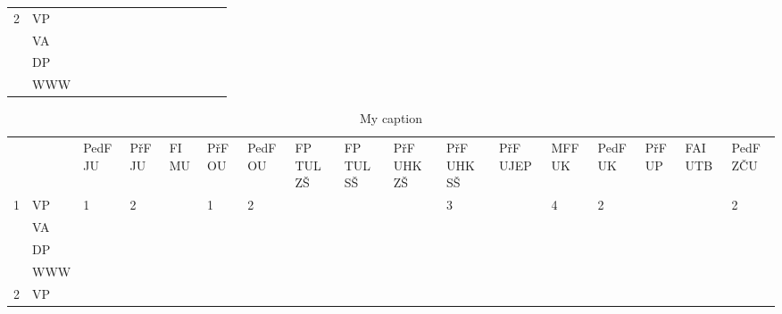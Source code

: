\documentclass[FP,DP]{tulthesis}
\begin{document}
{{{{{{{\begin{table}[]
\begin{tabular}{@{}C{0.5cm}C{1cm}C{0.7cm}C{0.6cm}C{0.6cm}C{0.7cm}C{0.7cm}C{0.6cm}C{0.6cm}C{0.6cm}C{0.7cm}C{0.7cm}C{0.6cm}C{0.7cm}@{}}
2 & VP       &         &        &       &        &         &          &         &          &        &         &        &          \\
  & VA        &         &        &       &        &         &          &         &          &        &         &        &          \\
  & DP        &         &        &       &        &         &          &         &          &        &         &        &          \\
  & WWW &         &        &       &        &         &          &         &          &        &         &        &         \\
\end{tabular}
\end{table}
\begin{table}[]
\centering
\scriptsize
\caption{My caption}
\label{my-label}
\tabcolsep=0.09cm
\begin{tabular}{@{}|C{0.5cm}|C{1cm}|C{0.7cm}|C{0.6cm}|C{0.6cm}|C{0.7cm}|C{0.7cm}|C{0.6cm}|C{0.6cm}|C{0.6cm}|C{0.7cm}|C{0.7cm}|C{0.7cm}|C{0.7cm}|C{0.7cm}|C{0.7cm}|C{0.7cm}|@{}}
\hline
  &     & PedF JU & PřF JU & FI MU & PřF OU & PedF OU & FP TUL ZŠ & FP TUL SŠ & PřF UHK ZŠ & PřF UHK SŠ & PřF UJEP & MFF UK & PedF UK & PřF UP & FAI UTB & PedF ZČU \\ 
1 & VP  &  1       & 2      &      & 1      & 2       & &           &            & 3          &   & 4      & 2       &    &         & 2        \\   
  & VA  &           &        &       &        &          &           &           &            &            &          &         &         &        &         &          \\ 
  & DP  &         &        &       &        &        &           &           &            &            &          &        &         &        &         &          \\ 
  & WWW &         &        &       &        &         &           &           &            &            &          &        &         &        &         &          \\ 
2 & VP  &          &        &       &        &         &           &            &             &     &          &        &          &        &         &          \\ 

\end{tabular}
\end{table}}}}}}}}
\end{document}
